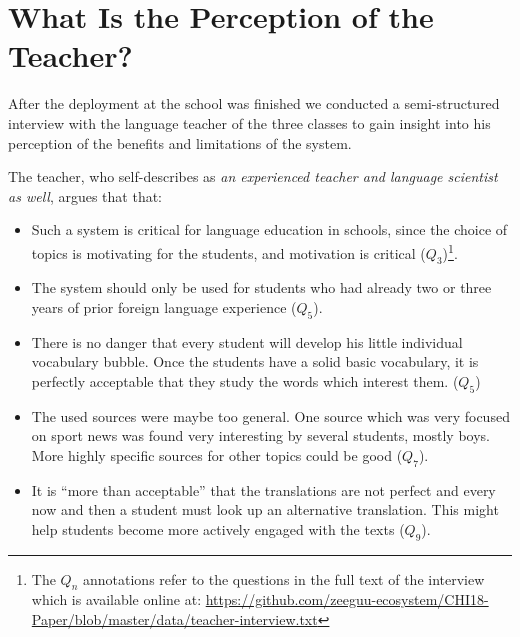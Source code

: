 
\newcommand{\q}[1]{($Q_#1$)}
\newcommand{\qq}[2]{($Q_#1,Q_{#2}$)}

\section{What Is the Perception of the Teacher?}
After the deployment at the school was finished we conducted a semi-structured interview with the language teacher of the three classes to gain insight into his perception of the benefits and limitations of the system. 

The teacher, who self-describes as {\em an experienced teacher and language scientist as well}, argues that that: 

\begin{itemize}

	\item Such a system is critical for language education in schools, since the choice of topics is motivating for the students, and motivation is critical \q{3}\footnote{The $Q_n$ annotations refer to the questions in the full text of the interview which is available online at: \url{https://github.com/zeeguu-ecosystem/CHI18-Paper/blob/master/data/teacher-interview.txt}}. 

	\item The system should only be used for students who had already two or three years of prior foreign language experience \q{5}. 

	\item There is no danger that every student will develop his little individual vocabulary bubble. Once the students have a solid basic vocabulary, it is perfectly acceptable that they study the words which interest them. \q{5}

	\item The used sources were maybe too general. One source which was very focused on sport news was found very interesting by several students, mostly boys. More highly specific sources for other topics could be good \q{7}.



	\item It is ``more than acceptable'' that the translations are not perfect and every now and then a student must look up an alternative translation. This might help students become more actively engaged with the texts \q{9}. 


\end{itemize}
